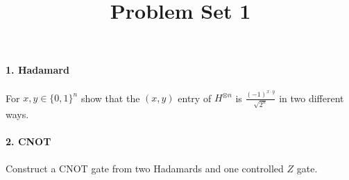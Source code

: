 


\title{Problem Set 1}
\date{}
\maketitle

\paragraph*{1. Hadamard}
For $x,y \in \{0,1\}^n$ show that the $(x,y)$ entry of $H^{\otimes n}$ is $\frac{(-1)^{x \cdot y}}{\sqrt{2^n}}$ in two different ways.

\paragraph{2. CNOT}
Construct a CNOT gate from two Hadamards and one controlled $Z$ gate.  

